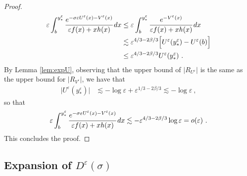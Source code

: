 \documentclass[reqno, 12pt, a4paper]{amsart}
\theoremstyle{plain}
\theoremstyle{definition}
\begin{document}
\begin{proof}
\begin{equation}
\begin{split}
\varepsilon \int_b^{y^\varepsilon_*} \cfrac{e^{-\sigma \varepsilon U^\varepsilon (x) - V^\varepsilon (x) }}{\varepsilon f(x) +x h(x)} \, dx 
&\le \varepsilon \int_{b}^{y^\varepsilon_*} \cfrac{e^{- V^\varepsilon (x) }}{\varepsilon f(x) +x h(x)} \, dx \\
&\lesssim \varepsilon^{4/3 -2\beta/3} \Big[ U^\varepsilon(y^\varepsilon_*) -U^\varepsilon (b)\Big]\\
&\le  \varepsilon^{4/3 -2\beta/3} U^\varepsilon (y^\varepsilon_*) \ .
\end{split}
\end{equation}
By Lemma \ref{lem:expU}, observing that the upper bound of $\vert R_{U^\varepsilon} \vert $ is the same as the upper bound for $\vert R_{V^\varepsilon}\vert$, we have that 
\begin{equation}
\begin{split}
\vert U^\varepsilon (y^\varepsilon_*) \vert  & \lesssim - \log \varepsilon + \varepsilon^{1/3 - 2\beta/3} \lesssim - \log \varepsilon \ , 
\end{split}
\end{equation}
so that
\begin{equation}
\begin{split}
\varepsilon \int_b^{y^\varepsilon_*} \cfrac{e^{-\sigma \varepsilon U^\varepsilon (x) - V^\varepsilon (x) }}{\varepsilon f(x) +x h(x)} \, dx \lesssim - \varepsilon^{4/3 -2\beta/3} \log \varepsilon = o(\varepsilon) \ .
\end{split}
\end{equation}
This concludes the proof.
\end{proof}

\subsection{Expansion of $D^\varepsilon (\sigma)$}
\end{document}
